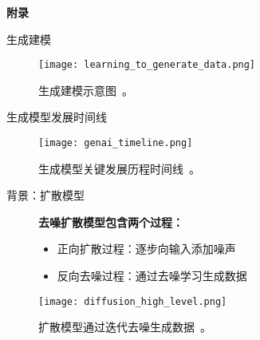 \begin{refsection}
  \begin{frame}[plain]
    \vfill
    \centering
    {\Huge \textbf{附录}}
    \vfill
  \end{frame}
\end{refsection}

\begin{refsection}
  \begin{frame}{生成建模}
    \begin{figure}
      \centering
      \texttt{[image: learning\_to\_generate\_data.png]}
      \caption{\scriptsize 生成建模示意图~\parencite{CVPR2023Tutorial}。}
    \end{figure}
    \bottomleftrefs
  \end{frame}
\end{refsection}

\begin{refsection}
\begin{frame}{生成模型发展时间线}
  \begin{figure}
    \centering
    \texttt{[image: genai\_timeline.png]}
    \caption{\scriptsize 生成模型关键发展历程时间线~\parencite{dengPPTAdvancedNueralNetwork2024}。}
  \end{figure}
  \bottomleftrefs
\end{frame}
\end{refsection}



\begin{refsection}
\begin{frame}{背景：扩散模型}

  \begin{figure}
    \begin{minipage}{0.95\linewidth}
      \footnotesize
      \textbf{去噪扩散模型包含两个过程：}
      \begin{itemize}
        \item 正向扩散过程：逐步向输入添加噪声
        \item 反向去噪过程：通过去噪学习生成数据
      \end{itemize}
    \end{minipage}
    \vspace{2em}

    \centering
    \texttt{[image: diffusion\_high\_level.png]}

    \caption[]{\scriptsize 扩散模型通过迭代去噪生成数据~\parencite{sohl2015deep,ho2020denoising}。}
  \end{figure}

  \bottomleftrefs
\end{frame}
\end{refsection}

